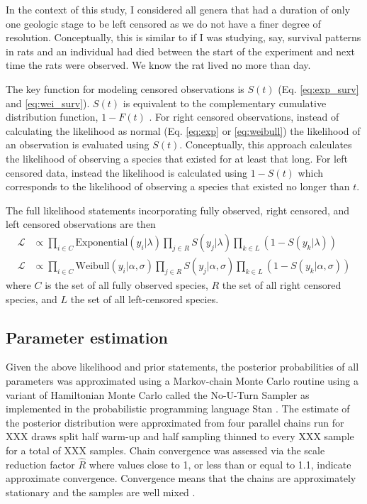 \documentclass[12pt,letterpaper]{article}
\begin{document}
In the context of this study, I considered all genera that had a duration of only one geologic stage to be left censored as we do not have a finer degree of resolution. Conceptually, this is similar to if I was studying, say, survival patterns in rats and an individual had died between the start of the experiment and next time the rats were observed. We know the rat lived no more than day.

The key function for modeling censored observations is \(S(t)\) (Eq. \ref{eq:exp_surv} and \ref{eq:wei_surv}). \(S(t)\) is equivalent to the complementary cumulative distribution function, \(1 - F(t)\) \citep{Klein2003}. For right censored observations, instead of calculating the likelihood as normal (Eq. \ref{eq:exp} or \ref{eq:weibull}) the likelihood of an observation is evaluated using \(S(t)\). Conceptually, this approach calculates the likelihood of observing a species that existed for at least that long. For left censored data, instead the likelihood is calculated using \(1 - S(t)\) which corresponds to the likelihood of observing a species that existed no longer than \(t\).

The full likelihood statements incorporating fully observed, right censored, and left censored observations are then
\begin{equation}
  \begin{aligned}
    \mathcal{L} &\propto \prod_{i \in C} \mathrm{Exponential}(y_{i} | \lambda) \prod_{j \in R} S(y_{j} | \lambda) \prod_{k \in L} \left(1 - S(y_{k} | \lambda)\right) \\
    \mathcal{L} &\propto \prod_{i \in C} \mathrm{Weibull}(y_{i} | \alpha, \sigma) \prod_{j \in R} S(y_{j} | \alpha, \sigma) \prod_{k \in L} \left(1 - S(y_{k} | \alpha, \sigma)\right)
  \end{aligned}
  \label{eq:censored_likelihood}
\end{equation}
where \(C\) is the set of all fully observed species, \(R\) the set of all right censored species, and \(L\) the set of all left-censored species.


\subsection{Parameter estimation}
Given the above likelihood and prior statements, the posterior probabilities of all parameters was approximated using a Markov-chain Monte Carlo routine using a variant of Hamiltonian Monte Carlo called the No-U-Turn Sampler \citep{Hoffman2014} as implemented in the probabilistic programming language Stan \citep{stan-software:2014}. The estimate of the posterior distribution were approximated from four parallel chains run for XXX draws split half warm-up and half sampling thinned to every XXX sample for a total of XXX samples. Chain convergence was assessed via the scale reduction factor \(\hat{R}\) where values close to 1, or less than or equal to 1.1, indicate approximate convergence. Convergence means that the chains are approximately stationary and the samples are well mixed \citep{Gelman2013d}.
\end{document}
